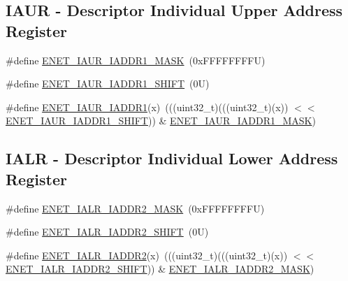 \subsection*{I\+A\+UR -\/ Descriptor Individual Upper Address Register}
\begin{DoxyCompactItemize}
\item 
\#define \mbox{\hyperlink{group___e_n_e_t___register___masks_ga2883158c5de2f27f29274ce0251b2f81}{E\+N\+E\+T\+\_\+\+I\+A\+U\+R\+\_\+\+I\+A\+D\+D\+R1\+\_\+\+M\+A\+SK}}~(0x\+F\+F\+F\+F\+F\+F\+F\+F\+U)
\item 
\#define \mbox{\hyperlink{group___e_n_e_t___register___masks_ga305ef40dd7fb1f6e7e0f4ba815db5210}{E\+N\+E\+T\+\_\+\+I\+A\+U\+R\+\_\+\+I\+A\+D\+D\+R1\+\_\+\+S\+H\+I\+FT}}~(0\+U)
\item 
\#define \mbox{\hyperlink{group___e_n_e_t___register___masks_ga43bd5e0645a476549c8662de0249e426}{E\+N\+E\+T\+\_\+\+I\+A\+U\+R\+\_\+\+I\+A\+D\+D\+R1}}(x)~(((uint32\+\_\+t)(((uint32\+\_\+t)(x)) $<$$<$ \mbox{\hyperlink{group___e_n_e_t___register___masks_ga305ef40dd7fb1f6e7e0f4ba815db5210}{E\+N\+E\+T\+\_\+\+I\+A\+U\+R\+\_\+\+I\+A\+D\+D\+R1\+\_\+\+S\+H\+I\+FT}})) \& \mbox{\hyperlink{group___e_n_e_t___register___masks_ga2883158c5de2f27f29274ce0251b2f81}{E\+N\+E\+T\+\_\+\+I\+A\+U\+R\+\_\+\+I\+A\+D\+D\+R1\+\_\+\+M\+A\+SK}})
\end{DoxyCompactItemize}
\subsection*{I\+A\+LR -\/ Descriptor Individual Lower Address Register}
\begin{DoxyCompactItemize}
\item 
\#define \mbox{\hyperlink{group___e_n_e_t___register___masks_gae646937c25a2d20a02a2afc7937f9f97}{E\+N\+E\+T\+\_\+\+I\+A\+L\+R\+\_\+\+I\+A\+D\+D\+R2\+\_\+\+M\+A\+SK}}~(0x\+F\+F\+F\+F\+F\+F\+F\+F\+U)
\item 
\#define \mbox{\hyperlink{group___e_n_e_t___register___masks_gadbb5d746c302629f7ed6dab197c0ed89}{E\+N\+E\+T\+\_\+\+I\+A\+L\+R\+\_\+\+I\+A\+D\+D\+R2\+\_\+\+S\+H\+I\+FT}}~(0\+U)
\item 
\#define \mbox{\hyperlink{group___e_n_e_t___register___masks_ga18aa21555b866b9c80f3e29a43b650cc}{E\+N\+E\+T\+\_\+\+I\+A\+L\+R\+\_\+\+I\+A\+D\+D\+R2}}(x)~(((uint32\+\_\+t)(((uint32\+\_\+t)(x)) $<$$<$ \mbox{\hyperlink{group___e_n_e_t___register___masks_gadbb5d746c302629f7ed6dab197c0ed89}{E\+N\+E\+T\+\_\+\+I\+A\+L\+R\+\_\+\+I\+A\+D\+D\+R2\+\_\+\+S\+H\+I\+FT}})) \& \mbox{\hyperlink{group___e_n_e_t___register___masks_gae646937c25a2d20a02a2afc7937f9f97}{E\+N\+E\+T\+\_\+\+I\+A\+L\+R\+\_\+\+I\+A\+D\+D\+R2\+\_\+\+M\+A\+SK}})
\end{DoxyCompactItemize}
